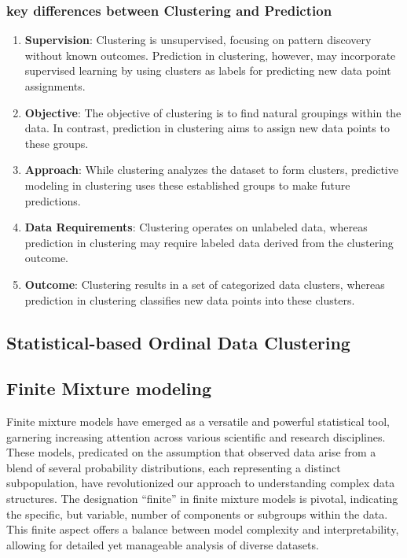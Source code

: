 \documentclass{article}
\begin{document}
\subsubsection*{key differences between Clustering and Prediction}

\begin{enumerate}
  \item \textbf{Supervision}: 
  Clustering is unsupervised, focusing on pattern discovery without known outcomes. Prediction in clustering, however, may incorporate supervised learning by using clusters as labels for predicting new data point assignments.
  \item \textbf{Objective}:
  The objective of clustering is to find natural groupings within the data. In contrast, prediction in clustering aims to assign new data points to these groups.
  \item \textbf{Approach}:
  While clustering analyzes the dataset to form clusters, predictive modeling in clustering uses these established groups to make future predictions.
  \item \textbf{Data Requirements}:
  Clustering operates on unlabeled data, whereas prediction in clustering may require labeled data derived from the clustering outcome.
  \item \textbf{Outcome}:
  Clustering results in a set of categorized data clusters, whereas prediction in clustering classifies new data points into these clusters.
  
\end{enumerate}

\subsection{Statistical-based Ordinal Data Clustering}

\subsection*{Finite Mixture modeling}

Finite mixture models have emerged as a versatile and powerful statistical tool, garnering increasing attention across various scientific and research disciplines. These models, predicated on the assumption that observed data arise from a blend of several probability distributions, each representing a distinct subpopulation, have revolutionized our approach to understanding complex data structures. The designation ``finite'' in finite mixture models is pivotal, indicating the specific, but variable, number of components or subgroups within the data. This finite aspect offers a balance between model complexity and interpretability, allowing for detailed yet manageable analysis of diverse datasets.
\end{document}
